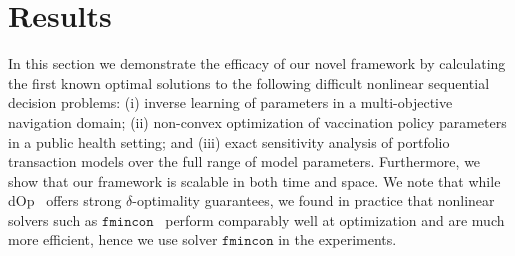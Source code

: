 \section{Results}
\label{sec:results}

In this section we demonstrate the efficacy of our novel framework by calculating the first known optimal solutions to the following difficult nonlinear sequential decision problems: (i) inverse learning of parameters in a multi-objective navigation domain; (ii) non-convex optimization of vaccination policy parameters in a public health setting; and (iii) exact sensitivity analysis of portfolio transaction models over the full range of model parameters. Furthermore, we show that our framework is scalable in both time and space. We note that while dOp~\parencite{Gao2013} offers strong {\footnotesize $ \delta $}-optimality guarantees, we found in practice that nonlinear solvers such as $ \mathtt{fmincon} $~\parencite{MATLAB_2010} perform comparably well at optimization and are much more efficient, hence we use solver $ \mathtt{fmincon} $ in the experiments.

